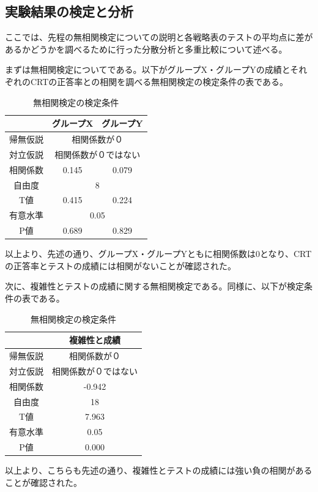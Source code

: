 \subsection{実験結果の検定と分析}

ここでは、先程の無相関検定についての説明と各戦略表のテストの平均点に差があるかどうかを調べるために行った分散分析と多重比較について述べる。

まずは無相関検定についてである。以下がグループX・グループYの成績とそれぞれのCRTの正答率との相関を調べる無相関検定の検定条件の表である。
\begin{table}[H]
    \begin{center}
        \caption{無相関検定の検定条件}        
        \begin{tabular}{|c|c|c|}
        \hline
            & グループX          & グループY          \\ \hline
        帰無仮説 & \multicolumn{2}{c|}{相関係数が０}     \\ \hline
        対立仮説 & \multicolumn{2}{c|}{相関係数が０ではない} \\ \hline
        相関係数 & 0.145          & 0.079          \\ \hline
        自由度  & \multicolumn{2}{c|}{8}          \\ \hline
        T値   & 0.415          & 0.224          \\ \hline
        有意水準 & \multicolumn{2}{c|}{0.05}       \\ \hline
        P値   & 0.689          & 0.829          \\ \hline
        \end{tabular}
    \end{center}
\end{table}
以上より、先述の通り、グループX・グループYともに相関係数は0となり、CRTの正答率とテストの成績には相関がないことが確認された。

次に、複雑性とテストの成績に関する無相関検定である。同様に、以下が検定条件の表である。
\begin{table}[H]
    \begin{center}
        \caption{無相関検定の検定条件}
        \begin{tabular}{|c|c|}
        \hline
            & 複雑性と成績     \\ \hline
        帰無仮説 & 相関係数が０     \\ \hline
        対立仮説 & 相関係数が０ではない \\ \hline
        相関係数 & -0.942     \\ \hline
        自由度  & 18         \\ \hline
        T値   & 7.963      \\ \hline
        有意水準 & 0.05       \\ \hline
        P値   & 0.000      \\ \hline
        \end{tabular}
    \end{center}
\end{table}
以上より、こちらも先述の通り、複雑性とテストの成績には強い負の相関があることが確認された。

